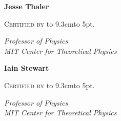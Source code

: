 %
%


\NewDocumentCommand{}

\NewDocumentCommand{}

\newcommand{\hruledotted}[2]{
\begin{flushleft}
    {\Large \textsc{#1 by}} \hbox to #2{\leaders\hbox to 5pt{\hss . \hss}\hfil}
\end{flushleft}
}

\begin{flushright}



\vspace{10pt}

\textbf{Jesse Thaler}
\vspace{-18pt}
\hruledotted{Certified}{9.3cm}
\vspace{-5pt}
{\itshape
Professor of Physics
\\
MIT Center for Theoretical Physics
}%
\end{flushright}

\begin{flushright}

\vspace{10pt}

\textbf{Iain Stewart}
\vspace{-18pt}
\hruledotted{Certified}{9.3cm}
\vspace{-5pt}
{\itshape
Professor of Physics
\\
MIT Center for Theoretical Physics
\\[18pt]
}
\end{flushright}

